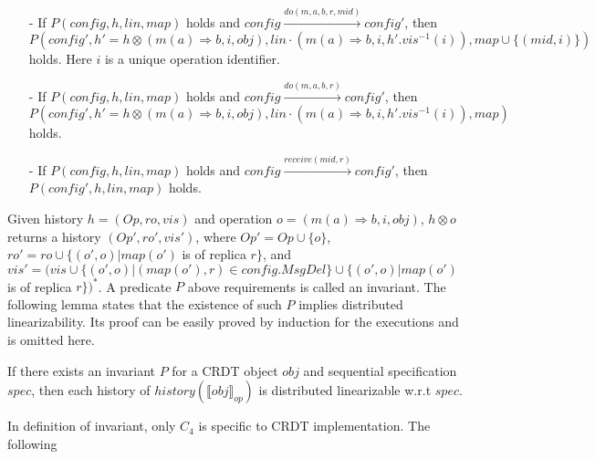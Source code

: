 \begin{itemize}
\setlength{\itemsep}{0.5pt}
\item[-] If $P(\mathit{config},h,\mathit{lin},\mathit{map})$ holds and $\mathit{config} {\xrightarrow{\mathit{do}(m,a,b,r,\mathit{mid})}} \mathit{config}'$, then $P(\mathit{config}', h' = h \otimes (m(a) \Rightarrow b,i,\mathit{obj}), \mathit{lin} \cdot (m(a) \Rightarrow b,i,h'.\mathit{vis}^{-1}(i)),\mathit{map} \cup \{ (\mathit{mid}, i) \})$ holds. Here $i$ is a unique operation identifier.

\item[-] If $P(\mathit{config},h,\mathit{lin},\mathit{map})$ holds and $\mathit{config} {\xrightarrow{\mathit{do}(m,a,b,r)}} \mathit{config}'$, then $P(\mathit{config}',h' = h \otimes (m(a) \Rightarrow b,i,\mathit{obj}), \mathit{lin} \cdot (m(a) \Rightarrow b,i,h'.\mathit{vis}^{-1}(i)),\mathit{map})$ holds.

\item[-] If $P(\mathit{config},h,\mathit{lin},\mathit{map})$ holds and $\mathit{config} {\xrightarrow{\mathit{receive}(\mathit{mid},r)}} \mathit{config}'$, then $P(\mathit{config}',h,\mathit{lin},\mathit{map})$ holds.
\end{itemize} 

Given history $h = (\mathit{Op},\mathit{ro},\mathit{vis})$ and operation $o = (m(a) \Rightarrow b,i,\mathit{obj})$, $h \otimes o$ returns a history $(\mathit{Op}',\mathit{ro}',\mathit{vis}')$, where $\mathit{Op}' = \mathit{Op} \cup \{ o \}$, $\mathit{ro}' = \mathit{ro} \cup \{ (o',o) \vert \mathit{map}(o')$ is of replica $r \}$, and $\mathit{vis}' = (\mathit{vis} \cup \{ (o',o) \vert (\mathit{map}(o'),r) \in \mathit{config}.\mathit{MsgDel} \} \cup \{ (o',o) \vert \mathit{map}(o')$ is of replica $r \})^*$. A predicate $P$ above requirements is called an invariant. The following lemma states that the existence of such $P$ implies distributed linearizability. Its proof can be easily proved by induction for the executions and is omitted here. 

\begin{lemma}
\label{lemma:invariant of operation-based CRDT implies distributed linearizability}
If there exists an invariant $P$ for a CRDT object $\mathit{obj}$ and sequential specification $\mathit{spec}$, then each history of $\mathit{history}(\llbracket \mathit{obj} \rrbracket_{\mathit{op}})$ is distributed linearizable w.r.t $\mathit{spec}$.
\end{lemma} 

In definition of invariant, only $C_4$ is specific to CRDT implementation. The following 

